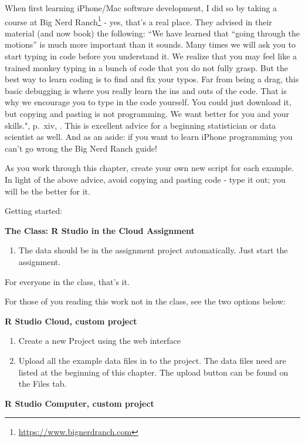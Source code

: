 \documentclass[
]{krantz}
\providecommand{\tightlist}{%
  \setlength{\itemsep}{0pt}\setlength{\parskip}{0pt}}
\renewcommand{\href}[2]{#2\footnote{\url{#1}}}
\begin{document}
When first learning iPhone/Mac software development, I did so by taking a course at \href{https://www.bignerdranch.com}{Big Nerd Ranch} - yes, that's a real place. They advised in their material (and now book) the following: ``We have learned that ``going through the motions'' is much more important than it sounds. Many times we will ask you to start typing in code before you understand it. We realize that you may feel like a trained monkey typing in a bunch of code that you do not fully grasp. But the best way to learn coding is to find and fix your typos. Far from being a drag, this basic debugging is where you really learn the ins and outs of the code. That is why we encourage you to type in the code yourself. You could just download it, but copying and pasting is not programming. We want better for you and your skills.", p.~xiv, \citep{keur2020}. This is excellent advice for a beginning statistician or data scientist as well. And as an aside: if you want to learn iPhone programming you can't go wrong the Big Nerd Ranch guide!

As you work through this chapter, create your own new script for each example. In light of the above advice, avoid copying and pasting code - type it out; you will be the better for it.

Getting started:

\textbf{The Class: R Studio in the Cloud Assignment}

\begin{enumerate}
\def\labelenumi{\arabic{enumi}.}
\tightlist
\item
  The data should be in the assignment project automatically. Just start the assignment.
\end{enumerate}

For everyone in the class, that's it.

For those of you reading this work not in the class, see the two options below:

\textbf{R Studio Cloud, custom project}

\begin{enumerate}
\def\labelenumi{\arabic{enumi}.}
\item
  Create a new Project using the web interface
\item
  Upload all the example data files in to the project. The data files need are listed at the beginning of this chapter. The upload button can be found on the Files tab.
\end{enumerate}

\textbf{R Studio Computer, custom project}
\end{document}

